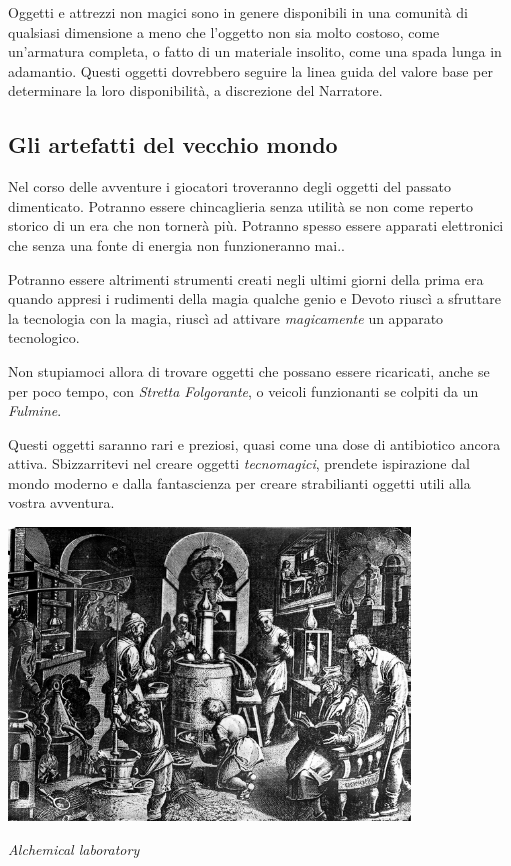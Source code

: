 \begin{multicols}{2}
Oggetti e attrezzi non magici sono in genere disponibili in una comunità di qualsiasi dimensione a meno che l'oggetto non sia molto costoso, come un'armatura completa, o fatto di un materiale insolito, come una spada lunga in adamantio. Questi oggetti dovrebbero seguire la linea guida del valore base per determinare la loro disponibilità, a discrezione del Narratore.

\subsection{Gli artefatti del vecchio mondo}

Nel corso delle avventure i giocatori troveranno degli oggetti del passato dimenticato. Potranno essere chincaglieria senza utilità se non come reperto storico di un era che non tornerà più. Potranno spesso essere apparati elettronici che senza una fonte di energia non funzioneranno mai..

Potranno essere altrimenti strumenti creati negli ultimi giorni della prima era quando appresi i rudimenti della magia qualche genio e Devoto riuscì a sfruttare la tecnologia con la magia, riuscì ad attivare \emph{magicamente} un apparato tecnologico.

Non stupiamoci allora di trovare oggetti che possano essere ricaricati, anche se per poco tempo, con \emph{Stretta Folgorante}, o veicoli funzionanti se colpiti da un \emph{Fulmine}. 

Questi oggetti saranno rari e preziosi, quasi come una dose di antibiotico ancora attiva. Sbizzarritevi nel creare oggetti \emph{tecnomagici}, prendete ispirazione dal mondo moderno e dalla fantascienza per creare strabilianti oggetti utili alla vostra avventura.

\end{multicols}

\vfill

\begin{center}
\includegraphics[keepaspectratio,width=0.8\textwidth]{immagini/Alchemical_laboratory_Wellcome_M0005193.png}

\emph{Alchemical laboratory}
\end{center}

\pagebreak

